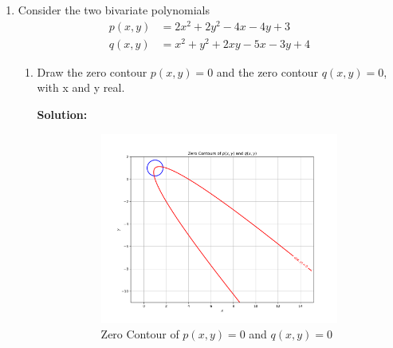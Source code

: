 \documentclass[conference,onecolumn]{IEEEtran}
\begin{document}
\begin{enumerate}[label=\arabic{enumi}.]
          \clearpage
    \item Consider the two bivariate polynomials
          \begin{align*}
              p(x, y) & = 2 x^2 + 2 y^2 - 4x - 4y + 3   \\
              q(x, y) & = x^2 + y^2 + 2xy - 5x - 3y + 4
          \end{align*}

          \begin{enumerate}
              \item Draw the zero contour $p(x, y) = 0$ and the zero contour $q(x, y) = 0$, with x and y real.

                    \textbf{Solution:}

                    \begin{figure}[H]
                        \centering
                        \begin{subfigure}{.8\linewidth}
                            \includegraphics[width=.99\linewidth]{figs/zero_contour_both.png}
                            \caption{Zero Contour of $p(x, y) = 0$ and $q(x, y) = 0$}
                        \end{subfigure}
                        \begin{subfigure}{.49\linewidth}

\end{subfigure}
\end{figure}
\end{enumerate}
\end{enumerate}
\end{document}
